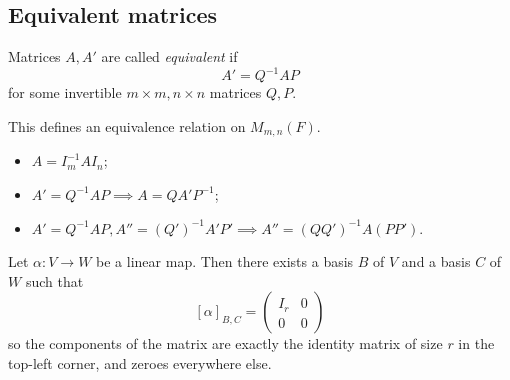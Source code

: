 \subsection{Equivalent matrices}
\begin{definition}
	Matrices \( A, A' \) are called \textit{equivalent} if
	\[
		A' = Q^{-1}AP
	\]
	for some invertible \( m \times m, n \times n \) matrices \( Q, P \).
\end{definition}
\begin{remark}
	This defines an equivalence relation on \( M_{m,n}(F) \).
	\begin{itemize}
		\item \( A = I_m^{-1} A I_n \);
		\item \( A' = Q^{-1} AP \implies A = Q A' P^{-1} \);
		\item \( A' = Q^{-1}AP, A'' = (Q')^{-1}A'P' \implies A'' = (QQ')^{-1}A(PP') \).
	\end{itemize}
\end{remark}
\begin{proposition}
	Let \( \alpha \colon V \to W \) be a linear map.
	Then there exists a basis \( B \) of \( V \) and a basis \( C \) of \( W \) such that
	\[
		[\alpha]_{B,C} = \begin{pmatrix}
			I_r & 0 \\
			0   & 0
		\end{pmatrix}
	\]
	so the components of the matrix are exactly the identity matrix of size \( r \) in the top-left corner, and zeroes everywhere else.
\end{proposition}
